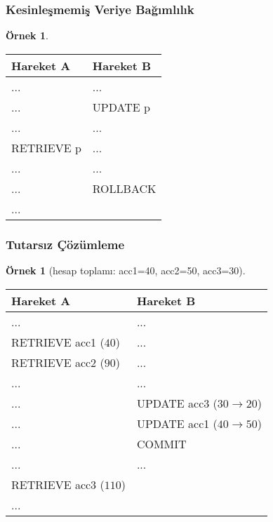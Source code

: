 \documentclass[dvipsnames]{beamer}
\theoremstyle{definition}
\theoremstyle{example}
\newtheorem{ornek}[theorem]{Örnek}
\theoremstyle{plain}
\begin{document}
\begin{frame}[fragile]
  \frametitle{Kesinleşmemiş Veriye Bağımlılık}

  \begin{ornek}
    \begin{table}
      \begin{tabular}{ll}
Hareket A  & Hareket B\\\hline
...        & ...      \\\pause
...        & UPDATE p \\\pause
...        & ...      \\
RETRIEVE p & ...      \\\pause
...        & ...      \\
...        & ROLLBACK \\
...        &
      \end{tabular}
    \end{table}
  \end{ornek}
\end{frame}

\begin{frame}[fragile]
  \frametitle{Tutarsız Çözümleme}

  \begin{ornek}[hesap toplamı: acc1=40, acc2=50, acc3=30]
    \begin{table}
      \begin{tabular}{ll}
Hareket A             & Hareket B                        \\\hline
...                   & ...                              \\\pause
RETRIEVE acc1 ($40$)  & ...                              \\\pause
RETRIEVE acc2 ($90$)  & ...                              \\\pause
...                   & ...                              \\
...                   & UPDATE acc3 ($30 \rightarrow 20$)\\
...                   & UPDATE acc1 ($40 \rightarrow 50$)\\
...                   & COMMIT                           \\\pause
...                   & ...                              \\
RETRIEVE acc3 ($110$) &                                  \\
...                   &
      \end{tabular}
    \end{table}
  \end{ornek}
\end{frame}
\end{document}
